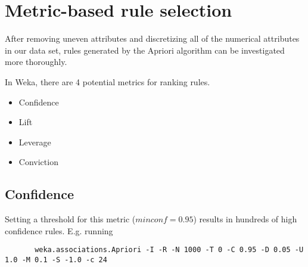 \section{Metric-based rule selection}

After removing uneven attributes and discretizing all of the numerical attributes in our data set, rules generated by the Apriori algorithm can be investigated more thoroughly.

\noindent
In Weka, there are 4 potential metrics for ranking rules.
\begin{itemize}
\item Confidence
\item Lift
\item Leverage
\item Conviction
\end{itemize}
%
\subsection{Confidence}
Setting a threshold for this metric ($minconf = 0.95$) results in hundreds of high confidence rules.
E.g. running 
\begin{verbatim}
	   weka.associations.Apriori -I -R -N 1000 -T 0 -C 0.95 -D 0.05 -U 1.0 -M 0.1 -S -1.0 -c 24
\end{verbatim}

